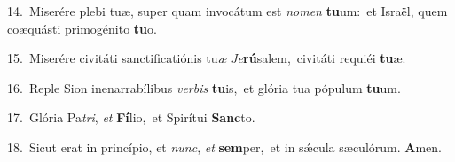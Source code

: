 {\numbfont\textcolor{\numbcolor}{14.}}~Miserére plebi tuæ, super quam invocátum est \textit{no}\-\textit{men} \textbf{tu}\-um:~\star et Israël, quem coæquásti primogénito \textbf{tu}\-o.\par
{\numbfont\textcolor{\numbcolor}{15.}}~Miserére civitáti sanctificatiónis tu\textit{æ} \textit{Je}\-\textbf{rú}salem,~\star civitáti requiéi \textbf{tu}\-æ.\par
{\numbfont\textcolor{\numbcolor}{16.}}~Reple Sion inenarrabílibus \textit{ver}\-\textit{bis} \textbf{tu}\-is,~\star et glória tua pópulum \textbf{tu}\-um.\par
{\numbfont\textcolor{\numbcolor}{17.}}~Glória Pa\-\textit{tri}\-, \textit{et} \textbf{Fí}\-lio,~\star et Spirítui \textbf{Sanc}\-to.\par
{\numbfont\textcolor{\numbcolor}{18.}}~Sicut erat in princípio, et \textit{nunc}\-, \textit{et} \textbf{sem}\-per,~\star et in sǽcula sæculórum. \textbf{A}\-men.\par
